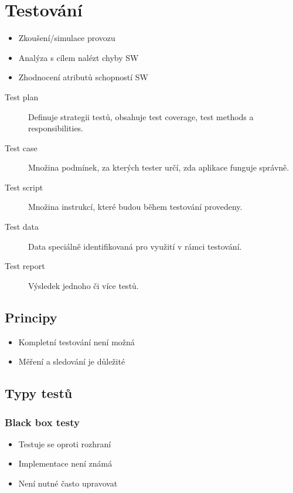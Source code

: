 \section{Testování}
  \begin{itemize}
    \item Zkoušení/simulace provozu
    \item Analýza s cílem nalézt chyby SW
    \item Zhodnocení atributů schopností SW
  \end{itemize}

  \begin{description}
    \item[Test plan] Definuje strategii testů, obsahuje test coverage, test methods a responsibilities.
    \item[Test case] Množina podmínek, za kterých tester určí, zda aplikace funguje správně.
    \item[Test script] Množina instrukcí, které budou během testování provedeny.
    \item[Test data] Data speciálně identifikovaná pro využití v rámci testování.
    \item[Test report] Výsledek jednoho či více testů.
  \end{description}

  \subsection{Principy}
    \begin{itemize}
      \item Kompletní testování není možná
      \item Měření a sledování je důležité
    \end{itemize}

  \subsection{Typy testů}
    \subsubsection{Black box testy}
      \begin{itemize}
        \item Testuje se oproti rozhraní
        \item Implementace není známá
        \item Není nutné často upravovat
      \end{itemize}

